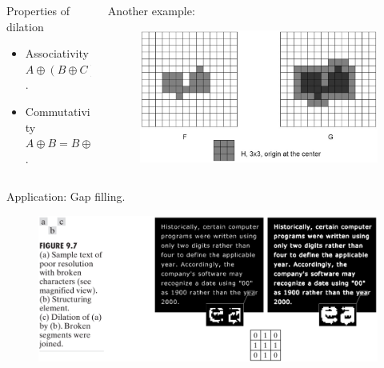 \begin{frame}
\begin{columns}
\begin{column}{.5\textwidth}
\begin{block}{Properties of dilation}
\begin{itemize}
\item Associativity $A \oplus \left ( B \oplus C \right ) = \left ( A \oplus B \right ) \oplus C$.\\
\item Commutativity $A \oplus B = B \oplus A$.
\end{itemize}
\end{block}
\end{column}
\begin{column}{.5\textwidth}
Another example:
\begin{figure}[!h]
\includegraphics[width=\textwidth]{dilation-ex-2}
\end{figure}
\end{column}
\end{columns}
\end{frame}

\begin{frame}
Application: Gap filling.
\begin{figure}[!h]
\includegraphics[width=\textwidth]{fig-9-7.png}
\end{figure}
\end{frame}

